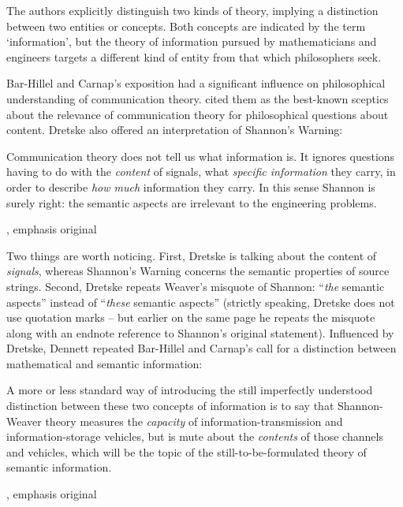\noindent The authors explicitly distinguish two kinds of theory, implying a distinction between two entities or concepts.
Both concepts are indicated by the term `information', but the theory of information pursued by mathematicians and engineers targets a different kind of entity from that which philosophers seek.

Bar-Hillel and Carnap's exposition had a significant influence on philosophical understanding of communication theory.
\citet[p. 241, n.
1]{dretske1981knowledge} cited them as the best-known sceptics about the relevance of communication theory for philosophical questions about content.
Dretske also offered an interpretation of {\sc Shannon's Warning}:

\begin{myquote}
Communication theory does not tell us what information is.
It ignores questions having to do with the \emph{content} of signals, what \emph{specific information} they carry, in order to describe \emph{how much} information they carry.
In this sense Shannon is surely right: the semantic aspects are irrelevant to the engineering problems.
\par\hspace*{\fill}\citet[41]{dretske1981knowledge}, emphasis original
\end{myquote}

\noindent Two things are worth noticing.
First, Dretske is talking about the content of \textit{signals}, whereas {\sc Shannon's Warning} concerns the semantic properties of source strings.
Second, Dretske repeats Weaver's misquote of Shannon: ``\textit{the} semantic aspects'' instead of ``\textit{these} semantic aspects'' (strictly speaking, Dretske does not use quotation marks -- but earlier on the same page he repeats the misquote along with an endnote reference to Shannon's original statement).
Influenced by Dretske, Dennett repeated Bar-Hillel and Carnap's call for a distinction between mathematical and semantic information:

\begin{myquote}
A more or less standard way of introducing the still imperfectly understood distinction between these two concepts of information is to say that Shannon-Weaver theory measures the \emph{capacity} of information-transmission and information-storage vehicles, but is mute about the \emph{contents} of those channels and vehicles, which will be the topic of the still-to-be-formulated theory of semantic information.
\par\hspace*{\fill}\citet[344]{dennett1983intentional}, emphasis original
\end{myquote}

